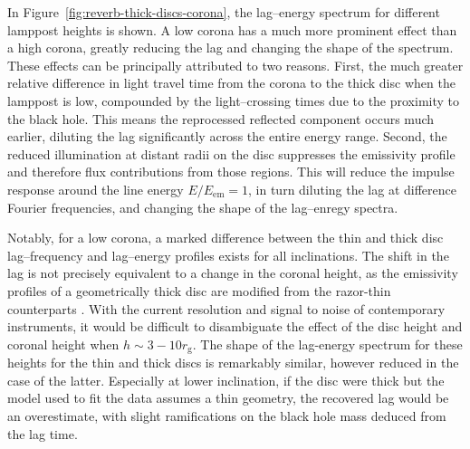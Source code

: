 \documentclass[fleqn,usenatbib]{mnras}
\begin{document}
In Figure~\ref{fig:reverb-thick-discs-corona}, the lag--energy spectrum for
different lamppost heights is shown. A low corona has a much more prominent
effect than a high corona, greatly reducing the lag and changing the shape of
the spectrum. These effects can be principally attributed to two reasons. First,
the much greater relative difference in light travel time from the corona to the
thick disc when the lamppost is low, compounded by the light--crossing times due
to the proximity to the black hole. This means the reprocessed reflected
component occurs much earlier, diluting the lag significantly across the entire
energy range. Second, the reduced illumination at distant radii on the disc
suppresses the emissivity profile and therefore flux contributions from those
regions. This will reduce the impulse response around the line energy $E /
E_\text{em} =
1$, in turn diluting the lag at difference Fourier frequencies, and changing the
shape of the lag--enregy spectra.

Notably, for a low corona, a marked difference between the thin and thick disc
lag--frequency and lag--energy profiles exists for all inclinations. The shift
in the lag is not precisely equivalent to a change in the coronal height, as the
emissivity profiles of a geometrically thick disc are modified from the
razor-thin counterparts \citep{taylor_x-ray_2018}. With the current resolution
and signal to noise of contemporary instruments, it would be difficult to
disambiguate the effect of the disc height and coronal height when $h \sim 3 - 10
r_\text{g}$. The shape of the lag-energy spectrum for these heights for the thin
and thick discs is remarkably similar, however reduced in the case of the
latter. Especially at lower inclination, if the disc were thick but the model
used to fit the data assumes a thin geometry, the recovered lag would be an
overestimate, with slight ramifications on the black hole mass deduced from the
lag time.
\end{document}

